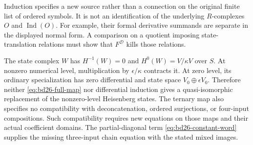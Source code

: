 Induction specifies a new source rather than a connection on the original finite list of ordered symbols.
It is not an identification of the underlying $R$-complexes $O$ and $\operatorname{Ind}(O)$.
For example, their formal derivative summands are separate in the displayed normal form.
A comparison on a quotient imposing state-translation relations must show that $F^{\mathcal D}$ kills those relations.

The state complex $W$ has $H^{-1}(W)=0$ and $H^0(W)=V/\kappa V$ over $S$.
At nonzero numerical level, multiplication by $\epsilon/\kappa$ contracts it.
At zero level, its ordinary specialization has zero differential and state space $V_0\oplus\epsilon V_0$.
Therefore neither \eqref{eq:bd26-full-map} nor differential induction gives a quasi-isomorphic replacement of the nonzero-level Heisenberg states.
The ternary map also specifies no compatibility with deconcatenation, ordered surjections, or four-input compositions.
Such compatibility requires new equations on those maps and their actual coefficient domains.
The partial-diagonal term \eqref{eq:bd26-constant-word} supplies the missing three-input chain equation with the stated mixed images.
